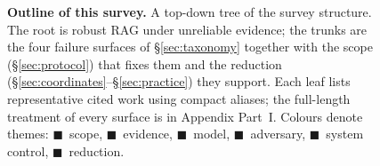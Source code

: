\begin{figure}[!t]
{{%
}}
\caption{\textbf{Outline of this survey.} A top-down tree of the survey
structure. The root is robust RAG under unreliable evidence; the trunks are the
four failure surfaces of \S\ref{sec:taxonomy} together with the scope
(\S\ref{sec:protocol}) that fixes them and the reduction
(\S\ref{sec:coordinates}--\S\ref{sec:practice}) they support. Each leaf lists
representative cited work using compact aliases; the full-length treatment of
every surface is in Appendix Part~I. Colours denote themes:
\textcolor{rragBg}{$\blacksquare$~scope}, \textcolor{rragEv}{$\blacksquare$~evidence},
\textcolor{rragMd}{$\blacksquare$~model}, \textcolor{rragAt}{$\blacksquare$~adversary},
\textcolor{rragCt}{$\blacksquare$~system control}, \textcolor{rragFu}{$\blacksquare$~reduction}.}
\label{fig:survey_outline}
\end{figure}
